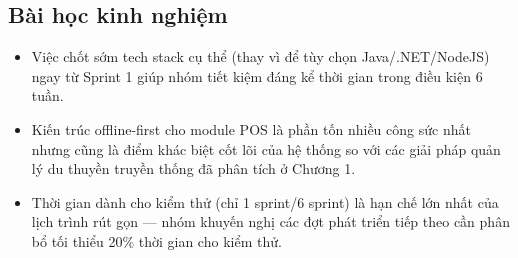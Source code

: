\subsection{Bài học kinh nghiệm}
\begin{itemize}
    \item Việc chốt sớm tech stack cụ thể (thay vì để tùy chọn
    Java/.NET/NodeJS) ngay từ Sprint 1 giúp nhóm tiết kiệm đáng kể thời
    gian trong điều kiện 6 tuần.
    \item Kiến trúc offline-first cho module POS là phần tốn nhiều công
    sức nhất nhưng cũng là điểm khác biệt cốt lõi của hệ thống so với
    các giải pháp quản lý du thuyền truyền thống đã phân tích ở Chương
    1.
    \item Thời gian dành cho kiểm thử (chỉ 1 sprint/6 sprint) là hạn chế
    lớn nhất của lịch trình rút gọn — nhóm khuyến nghị các đợt phát
    triển tiếp theo cần phân bổ tối thiểu 20\% thời gian cho kiểm thử.
\end{itemize}
